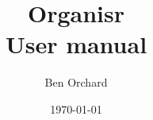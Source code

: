 

\usepackage{amsfonts}
\usepackage{newunicodechar}

\usepackage{marginnote}

\newcommand{\tip}[1]{\medskip\noindent\reversemarginpar\marginnote{\textit{\textbf{TIP}}}#1\medskip}



\title{Organisr\\
User manual}
\author{Ben Orchard}

\date{\today}

\maketitle

\clearpage
\tableofcontents
\clearpage

\newcommand{\guiel}[1]{\textbf{#1}}
\newcommand{\fullimg}[1]{\texttt{[image: \#1]}}
\newcommand{\smallimg}[1]{\texttt{[image: \#1]}}
\newcommand{\halfimg}[1]{\texttt{[image: \#1]}}

\clearpage
{}
\clearpage
{}
\clearpage
{}


